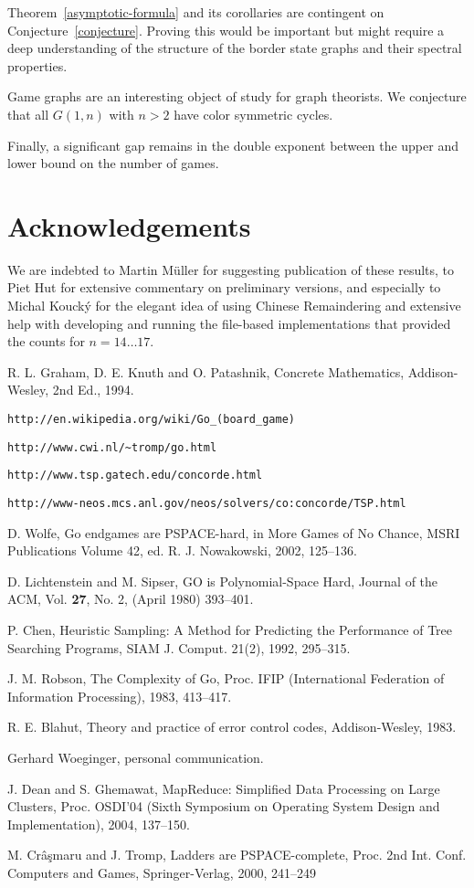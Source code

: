 \documentclass{article}
\begin{document}
Theorem~\ref{asymptotic-formula} and its corollaries are contingent on
Conjecture~\ref{conjecture}. Proving this would be important but might
require a deep understanding of the structure of the border state
graphs and their spectral properties.

Game graphs are an interesting object of study for graph theorists.
We conjecture that all $G(1,n)$ with $n>2$ have color symmetric cycles.

Finally, a significant gap remains in the double exponent
between the upper and lower bound on the number of games.

\section{Acknowledgements}
We are indebted to Martin M\"{u}ller for suggesting publication of
these results,
to Piet Hut for extensive commentary on preliminary versions,
and especially to Michal Kouck\'{y} for the elegant idea of using
Chinese Remaindering and extensive help with developing and
running the file-based implementations that provided
the counts for $n=14 \ldots 17$.

\begin{thebibliography}{99}

R. L. Graham, D. E. Knuth and O. Patashnik,
Concrete Mathematics, Addison-Wesley, 2nd Ed., 1994.

{\tt http://en.wikipedia.org/wiki/Go\_(board\_game)}

{\tt http://www.cwi.nl/\~{ }tromp/go.html}

{\tt http://www.tsp.gatech.edu/concorde.html}

{\tt http://www-neos.mcs.anl.gov/neos/solvers/co:concorde/TSP.html}

 D. Wolfe,
Go endgames are PSPACE-hard,
in More Games of No Chance,
MSRI Publications Volume 42, ed. R. J. Nowakowski, 2002, 125--136.

 D. Lichtenstein and M. Sipser,
GO is Polynomial-Space Hard,
Journal of the ACM,  Vol. {\bf 27}, No. 2, (April 1980) 393--401.

 P. Chen, Heuristic Sampling: A Method for Predicting the Performance of Tree Searching Programs, SIAM J. Comput. 21(2), 1992, 295--315.

 J. M. Robson, The Complexity of Go, Proc. IFIP
(International Federation of Information Processing), 1983, 413--417.

R. E. Blahut, Theory and practice of error control codes, Addison-Wesley, 1983.

Gerhard Woeginger, personal communication.

J. Dean and S. Ghemawat,
MapReduce: Simplified Data Processing on Large Clusters,
Proc. OSDI'04 (Sixth Symposium on Operating System Design and Implementation),
2004, 137--150.

 M. Cr\^{a}\c{s}maru and J. Tromp,
Ladders are PSPACE-complete,
Proc. 2nd Int. Conf. Computers and Games, Springer-Verlag, 2000, 241--249

\end{thebibliography}
\end{document}
